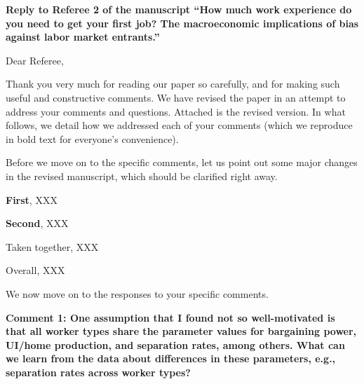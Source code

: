 \documentclass[12pt]{article}
\begin{document}
\theoremstyle{definition}
\newtheorem{definition}{Definition}%
\theoremstyle{definition}
\newtheorem{result}{Result}%
\theoremstyle{plain}
\newtheorem{lemma}{Lemma}%
\theoremstyle{plain}
\newtheorem{proposition}{Proposition}%
\theoremstyle{plain}
\newtheorem{theorem}{Theorem}%
\theoremstyle{plain}
\newtheorem{corollary}{Corollary}%

\begin{onehalfspacing}

\vspace{1.0cm}

\noindent \textbf{Reply to Referee 2 of the manuscript ``How much work experience do you need to get your first job? The macroeconomic implications of bias against labor market entrants.''}

\bigskip

Dear Referee,

\medskip

Thank you very much for reading our paper so carefully, and for making such useful and constructive comments. We have revised the paper in an attempt to address your comments and questions. Attached is the revised version. In what follows, we detail how we addressed each of your comments (which we reproduce in bold text for everyone's convenience).

Before we move on to the specific comments, let us point out some major changes in the revised manuscript, which should be clarified right away. 

\textbf{First}, XXX 

\textbf{Second}, XXX   


Taken together, XXX

Overall, XXX


We now move on to the responses to your specific comments. 

\bigskip
\bigskip

\textbf{Comment 1: One assumption that I found not so well-motivated is that all worker types share the parameter values for bargaining power, UI/home production, and separation rates, among others. What can we learn from the data about differences in these parameters, e.g., separation rates across worker types?}


\end{onehalfspacing}
\end{document}
